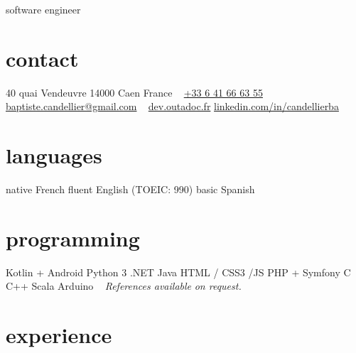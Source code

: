 \documentclass[]{friggeri-cv}
\begin{document}
{software engineer}

\begin{aside}
    \section{contact}
    40 quai Vendeuvre
    14000 Caen
    France
    ~
    \href{tel:0033641666355}{+33 6 41 66 63 55}
    \href{mailto:baptiste.candellier@gmail.com}{baptiste.candellier@gmail.com}
    ~
    {\href{https://dev.outadoc.fr}{dev.outadoc.fr}}
    {\href{https://www.linkedin.com/in/candellierba/}{linkedin.com/in/candellierba}}
    \section{languages}
    native French
    fluent English (TOEIC: 990)
    basic Spanish
    \section{programming}
    Kotlin + Android 
    Python 3 
    \csharp{} .NET 
    Java 
    HTML / CSS3 /JS 
    PHP + Symfony 
    C 
    C++ 
    Scala 
    Arduino 
    ~
    \textit{References available}
    \textit{on request.}
    \restorecr 
    \obeycr
\end{aside}

\section{experience}
\end{document}
